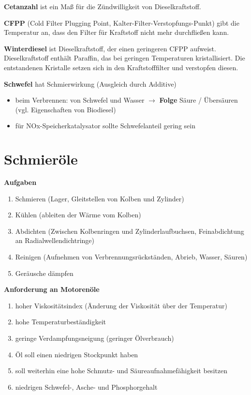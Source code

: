 \textbf{Cetanzahl} ist ein Maß für die Zündwilligkeit von
Dieselkraftstoff.

\textbf{CFPP} (Cold Filter Plugging Point,
Kalter-Filter-Verstopfungs-Punkt) gibt die Temperatur an, dass den
Filter für Kraftstoff nicht mehr durchfließen kann.

\textbf{Winterdiesel} ist Dieselkraftstoff, der einen geringeren CFPP
aufweist. Dieselkraftstoff enthält Paraffin, das bei geringen
Temperaturen kristallisiert. Die entstandenen Kristalle setzen sich in
den Kraftstofffilter und verstopfen diesen.

\textbf{Schwefel} hat Schmierwirkung (Ausgleich durch Additive)

\begin{itemize}
\item
  beim Verbrennen: von Schwefel und Wasser $\to$ \textbf{Folge} Säure
  / Übersäuren (vgl. Eigenschaften von Biodiesel)
\item
  für NOx-Speicherkatalysator sollte Schwefelanteil gering sein
\end{itemize}

\section{Schmieröle}\label{schmieroele}

\textbf{Aufgaben}

\begin{enumerate}
\item
  Schmieren (Lager, Gleitstellen von Kolben und Zylinder)
\item
  Kühlen (ableiten der Wärme vom Kolben)
\item
  Abdichten (Zwischen Kolbenringen und Zylinderlaufbuchsen,
  Feinabdichtung an Radialwellendichtringe)
\item
  Reinigen (Aufnehmen von Verbrennungsrückständen, Abrieb, Wasser,
  Säuren)
\item
  Geräusche dämpfen
\end{enumerate}

\textbf{Anforderung an Motorenöle}

\begin{enumerate}
\item
  hoher Viskositätsindex (Änderung der Viskosität über der Temperatur)
\item
  hohe Temperaturbeständigkeit
\item
  geringe Verdampfungsneigung (geringer Ölverbrauch)
\item
  Öl soll einen niedrigen Stockpunkt haben
\item
  soll weiterhin eine hohe Schmutz- und Säureaufnahmefähigkeit besitzen
\item
  niedrigen Schwefel-, Asche- und Phosphorgehalt
\end{enumerate}

